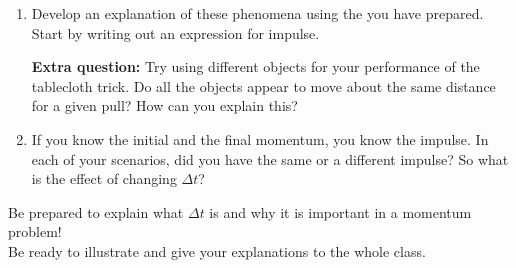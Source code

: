\begin{enumerate}
	\item Develop an explanation of these phenomena using the \pcharts{} you have prepared. Start by writing out an expression for impulse.
	
	\textbf{Extra question:} Try using different objects for your performance of the tablecloth trick. Do all the objects appear to move about the same distance for a given pull? How can you explain this?
	
	\item If you know the initial and the final momentum, you know the impulse. In each of your scenarios, did you have the same or a different impulse? So what is the effect of changing $\Delta t$? 
\end{enumerate}

\noindent Be prepared to explain what $\Delta t$ is and why it is important in a momentum problem!\\

\noindent Be ready to illustrate and give your explanations to the whole class.

\vspace{8pt}
\WCD